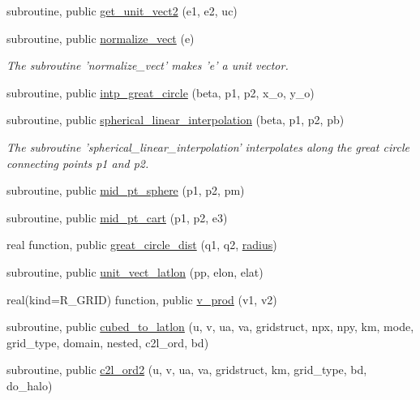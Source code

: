 \begin{DoxyCompactItemize}
subroutine, public \hyperlink{classfv__grid__utils__mod_a092aabe65224216e6209babe7f15669e}{get\-\_\-unit\-\_\-vect2} (e1, e2, uc)
\item 
subroutine, public \hyperlink{classfv__grid__utils__mod_a3fedbacc4264bbd4d209d089a059b14c}{normalize\-\_\-vect} (e)
\begin{DoxyCompactList}\small\item\em The subroutine 'normalize\-\_\-vect' makes 'e' a unit vector. \end{DoxyCompactList}\item 
subroutine, public \hyperlink{classfv__grid__utils__mod_ae1173a7fe794cee15b8b50a6b4d3cb9e}{intp\-\_\-great\-\_\-circle} (beta, p1, p2, x\-\_\-o, y\-\_\-o)
\item 
subroutine, public \hyperlink{classfv__grid__utils__mod_adfe8284f08a2363ce2d21dbc79ad3d98}{spherical\-\_\-linear\-\_\-interpolation} (beta, p1, p2, pb)
\begin{DoxyCompactList}\small\item\em The subroutine 'spherical\-\_\-linear\-\_\-interpolation' interpolates along the great circle connecting points p1 and p2. \end{DoxyCompactList}\item 
subroutine, public \hyperlink{classfv__grid__utils__mod_a18ebcb54063bc4dc159f2a87771d4358}{mid\-\_\-pt\-\_\-sphere} (p1, p2, pm)
\item 
subroutine, public \hyperlink{classfv__grid__utils__mod_a4fc34e04ba263d5a514aa0d631871e8b}{mid\-\_\-pt\-\_\-cart} (p1, p2, e3)
\item 
real function, public \hyperlink{classfv__grid__utils__mod_ad3ca2b1362f0c6fe83b7cd28d4c67784}{great\-\_\-circle\-\_\-dist} (q1, q2, \hyperlink{classfv__grid__utils__mod_a9825bfea45f13a48cc658a3df88d3124}{radius})
\item 
subroutine, public \hyperlink{classfv__grid__utils__mod_a650900ea3f50071fb0743d5560dcaaf8}{unit\-\_\-vect\-\_\-latlon} (pp, elon, elat)
\item 
real(kind=R\-\_\-\-G\-R\-I\-D) function, public \hyperlink{classfv__grid__utils__mod_a22e29af5ace7233c29974f0189300fb9}{v\-\_\-prod} (v1, v2)
\item 
subroutine, public \hyperlink{classfv__grid__utils__mod_a41d77310cefec9ce0f98f0afe2440d67}{cubed\-\_\-to\-\_\-latlon} (u, v, ua, va, gridstruct, npx, npy, km, mode, grid\-\_\-type, domain, nested, c2l\-\_\-ord, bd)
\item 
subroutine, public \hyperlink{classfv__grid__utils__mod_a8fa9923988d7afeb54c67bf5a92777bc}{c2l\-\_\-ord2} (u, v, ua, va, gridstruct, km, grid\-\_\-type, bd, do\-\_\-halo)

\end{DoxyCompactItemize}
